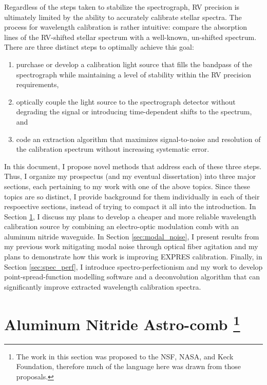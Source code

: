\documentclass[11pt]{article}
\begin{document}
Regardless of the steps taken to stabilize the spectrograph, RV precision is ultimately limited by the ability to accurately calibrate stellar spectra. The process for wavelength calibration is rather intuitive: compare the absorption lines of the RV-shifted stellar spectrum with a well-known, un-shifted spectrum. There are three distinct steps to optimally achieve this goal:
\begin{enumerate}
    \item purchase or develop a calibration light source that fills the bandpass of the spectrograph while maintaining a level of stability within the RV precision requirements,
    \item optically couple the light source to the spectrograph detector without degrading the signal or introducing time-dependent shifts to the spectrum, and
    \item code an extraction algorithm that maximizes signal-to-noise and resolution of the calibration spectrum without increasing systematic error.
\end{enumerate}

In this document, I propose novel methods that address each of these three steps. Thus, I organize my prospectus (and my eventual dissertation) into three major sections, each pertaining to my work with one of the above topics. Since these topics are so distinct, I provide background for them individually in each of their respoective sections, instead of trying to compact it all into the introduction. In Section \ref{sec:astro-comb}, I discuss my plans to develop a cheaper and more reliable wavelength calibration source by combining an electro-optic modulation comb with an aluminum nitride waveguide. In Section \ref{sec:modal_noise}, I present results from my previous work mitigating modal noise through optical fiber agitation and my plans to demonstrate how this work is improving EXPRES calibration. Finally, in Section \ref{sec:spec_perf}, I introduce spectro-perfectionism and my work to develop point-spread-function modelling software and a deconvolution algorithm that can significantly improve extracted wavelength calibration spectra.

\section{Aluminum Nitride Astro-comb \footnote{The work in this section was proposed to the NSF, NASA, and Keck Foundation, therefore much of the language here was drawn from those proposals.}}
\label{sec:astro-comb}
\end{document}
